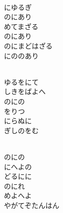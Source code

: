 \documentclass[10pt,b5j]{tarticle} %
\begin{document}
\begin{enumerate}
\begin{minipage}[c]{\blocksize}
    \end{minipage}
    \begin{minipage}[c]{\blocksize}
        
        \vspace{\linespace}
        \item~\\
        にゆるぎ\\
        のにあり\\
        めてまざる\\
        のにあり\\
        のにまどはざる\\
        にののあり
        
    \end{minipage}
    \begin{minipage}[c]{\blocksize}
        
        \vspace{\linespace}
        \item~\\
        ゆるをにて\\
        しきをばよへ\\
        のにの\\
        をりつ\\
        にらぬに\\
        ぎしのをむ
        
    \end{minipage}
    \begin{minipage}[c]{\blocksize}
        
        \vspace{\linespace}
        \item~\\
        のにの\\
        にへよの\\
        どるにに\\
        のにれ\\
        めよへよ\\
        やがてぞたんはん
    
    \end{minipage}
\end{enumerate} %
\end{document}
